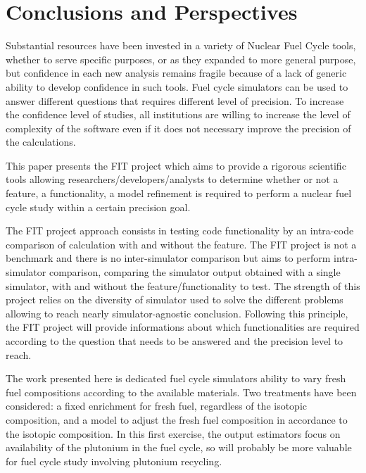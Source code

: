 \section{Conclusions and Perspectives}
\label{sec:conclusion}

Substantial resources have been invested in a variety of Nuclear Fuel Cycle
tools, whether to serve specific purposes, or as they expanded to more general
purpose, but confidence in each new analysis remains fragile because of a lack
of generic ability to develop confidence in such tools.
Fuel cycle simulators can be used to answer different questions that requires
different level of precision. To increase the confidence level of studies, all
institutions are willing to increase the level of complexity of the software
even if it does not necessary improve the precision of the calculations. 

This paper presents the FIT project which aims to provide a rigorous scientific
tools allowing researchers/developers/analysts to determine whether or not a
feature, a functionality, a model refinement is required to perform a nuclear
fuel cycle study within a certain precision goal.

The FIT project approach consists in testing code functionality by an intra-code
comparison of calculation with and without the feature. The FIT project is not a
benchmark and there is no inter-simulator comparison but aims to perform
intra-simulator comparison, comparing the simulator output obtained with a single
simulator, with and without the feature/functionality to test. The strength of
this project relies on the diversity of simulator used to solve the different
problems allowing to reach nearly simulator-agnostic conclusion. Following this
principle, the FIT project will provide informations about which functionalities
are required according to the question that needs to be answered and the
precision level to reach.

The work presented here is dedicated fuel cycle simulators ability to vary fresh
fuel compositions according to the available materials. Two treatments have been
considered: a fixed enrichment for fresh fuel, regardless of the isotopic
composition, and a model to adjust the fresh fuel composition in accordance
to the isotopic composition. In this first exercise, the output estimators focus
on availability of the plutonium in the fuel cycle, so will probably be more
valuable for fuel cycle study involving plutonium recycling.

